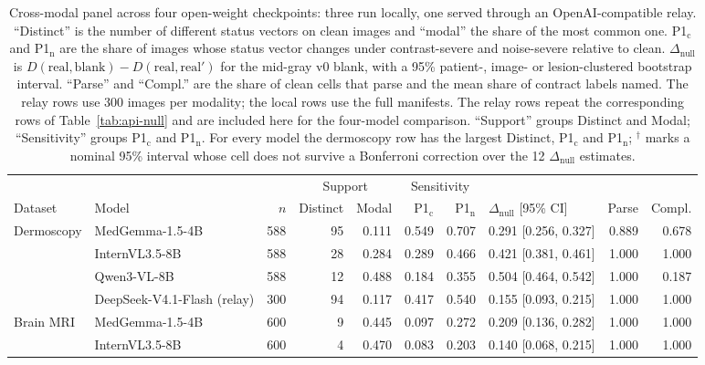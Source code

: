 \begin{table}[t]
\centering
\footnotesize
\setlength{\tabcolsep}{3pt}
\caption{Cross-modal panel across four open-weight checkpoints: three run locally, one
served through an OpenAI-compatible relay. ``Distinct'' is the number of different status
vectors on clean images and ``modal'' the share of the most common one. P1$_{\text{c}}$
and P1$_{\text{n}}$ are the share of images whose status vector changes under
contrast-severe and noise-severe relative to clean. $\Delta_{\text{null}}$ is
$D(\text{real},\text{blank})-D(\text{real},\text{real}')$ for the mid-gray v0 blank, with
a 95\% patient-, image- or lesion-clustered bootstrap interval. ``Parse'' and ``Compl.''
are the share of clean cells that parse and the mean share of contract labels named. The
relay rows use 300 images per modality; the local rows use the full manifests. The relay
rows repeat the corresponding rows of Table~\ref{tab:api-null} and are included here for
the four-model comparison. ``Support'' groups Distinct and Modal; ``Sensitivity''
groups P1$_{\text{c}}$ and P1$_{\text{n}}$. For every model the dermoscopy row has the largest Distinct,
P1$_{\text{c}}$ and P1$_{\text{n}}$; $^{\dagger}$ marks a nominal 95\% interval whose cell
does not survive a Bonferroni correction over the 12 $\Delta_{\text{null}}$ estimates.}
\label{tab:crossmodal4}
\begin{tabular}{l l r r r r r l r r}
\toprule
& & & \multicolumn{2}{c}{Support} & \multicolumn{2}{c}{Sensitivity} & & & \\
\cmidrule(lr){4-5}\cmidrule(lr){6-7}
Dataset & Model & $n$ & Distinct & Modal & P1$_{\text{c}}$ & P1$_{\text{n}}$ & $\Delta_{\text{null}}$ [95\% CI] & Parse & Compl. \\
\midrule
Dermoscopy & MedGemma-1.5-4B & 588 & 95 & 0.111 & 0.549 & 0.707 & 0.291 [0.256, 0.327] & 0.889 & 0.678 \\
           & InternVL3.5-8B & 588 & 28 & 0.284 & 0.289 & 0.466 & 0.421 [0.381, 0.461] & 1.000 & 1.000 \\
           & Qwen3-VL-8B & 588 & 12 & 0.488 & 0.184 & 0.355 & 0.504 [0.464, 0.542] & 1.000 & 0.187 \\
           & DeepSeek-V4.1-Flash (relay) & 300 & 94 & 0.117 & 0.417 & 0.540 & 0.155 [0.093, 0.215] & 1.000 & 1.000 \\
\midrule
Brain MRI  & MedGemma-1.5-4B & 600 & 9 & 0.445 & 0.097 & 0.272 & 0.209 [0.136, 0.282] & 1.000 & 1.000 \\
           & InternVL3.5-8B & 600 & 4 & 0.470 & 0.083 & 0.203 & 0.140 [0.068, 0.215] & 1.000 & 1.000 \\

\end{tabular}
\end{table}
